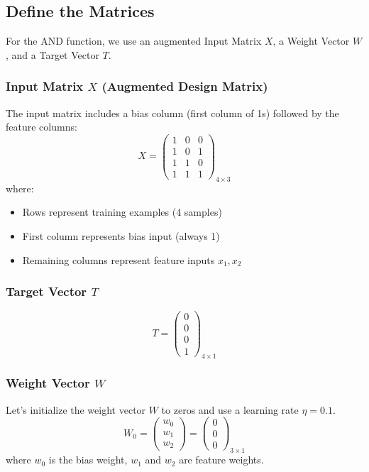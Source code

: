 \subsection{Define the Matrices}
For the AND function, we use an augmented Input Matrix \(X\), a Weight Vector \(W\), and a Target Vector \(T\).

\subsubsection{Input Matrix \(X\) (Augmented Design Matrix)}
The input matrix includes a bias column (first column of 1s) followed by the feature columns:
\[
X = \begin{pmatrix}
1 & 0 & 0 \\
1 & 0 & 1 \\
1 & 1 & 0 \\
1 & 1 & 1
\end{pmatrix}_{4 \times 3}
\]
where:
\begin{itemize}
    \item Rows represent training examples (4 samples)
    \item First column represents bias input (always 1)
    \item Remaining columns represent feature inputs \(x_1, x_2\)
\end{itemize}

\subsubsection{Target Vector \(T\)}
\[
T = \begin{pmatrix}
0 \\
0 \\
0 \\
1
\end{pmatrix}_{4 \times 1}
\]

\subsubsection{Weight Vector \(W\)}
Let's initialize the weight vector \(W\) to zeros and use a learning rate \(\eta = 0.1\).
\[
W_0 = \begin{pmatrix}
w_0 \\
w_1 \\
w_2
\end{pmatrix} = \begin{pmatrix}
0 \\
0 \\
0
\end{pmatrix}_{3 \times 1}
\]
where \(w_0\) is the bias weight, \(w_1\) and \(w_2\) are feature weights.


